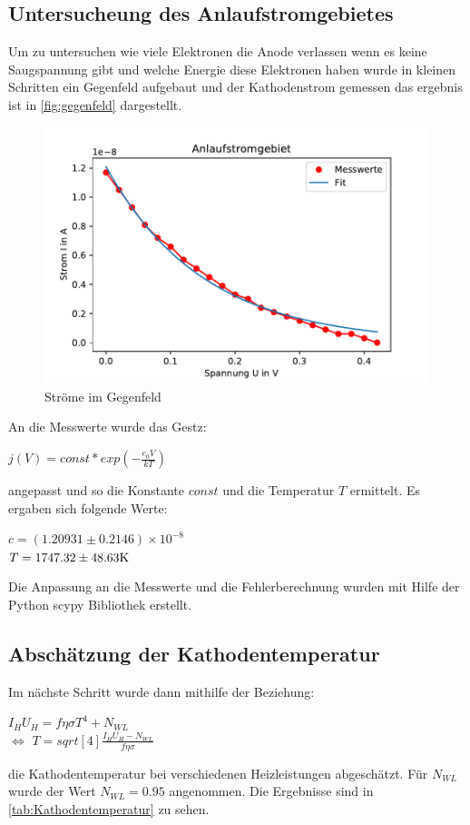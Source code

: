   \subsection{Untersucheung des Anlaufstromgebietes}
  \label{sec:anlaufstromgebiet}
  Um zu untersuchen wie viele Elektronen die Anode verlassen wenn es keine Saugspannung gibt und
  welche Energie diese Elektronen haben wurde in kleinen Schritten ein Gegenfeld aufgebaut und der Kathodenstrom 
  gemessen das ergebnis ist in \autoref{fig:gegenfeld} dargestellt.

  \begin{figure}
    \centering
    \includegraphics{anlaufstrom.pdf}
    \caption{Ströme im Gegenfeld}
    \label{fig:gegenfeld}
  \end{figure}

  An die Messwerte wurde das Gestz:
  \begin{center}
      $j(V)=const*exp(-\frac{e_0V}{kT})$
  \end{center}
  angepasst und so die Konstante $const$ und die Temperatur $T$ ermittelt. Es ergaben sich folgende Werte:
  \begin{center}
    $c=(1.20931\pm 0.2146)\times 10^{-8}$\\
    $T=1747.32\pm 48.63 \si[]{K}$
  \end{center}
  Die Anpassung an die Messwerte und die Fehlerberechnung wurden mit Hilfe der Python scypy Bibliothek erstellt.

  \subsection{Abschätzung der Kathodentemperatur}
  \label{sec:kathodentemperatur}
  Im nächste Schritt wurde dann mithilfe der Beziehung:
  \begin{center}
      $I_HU_H=f\eta \sigma T^4+N_{WL}$\\
      $\Leftrightarrow$ $T=sqrt[4]{\frac{I_HU_H-N_{WL}}{f\eta \sigma}}$
  \end{center}
  die Kathodentemperatur bei verschiedenen Heizleistungen abgeschätzt. 
  Für $N_{WL}$ wurde der Wert $N_{WL}=0.95$ angenommen. Die Ergebnisse sind in \autoref{tab:Kathodentemperatur}
  zu sehen.

